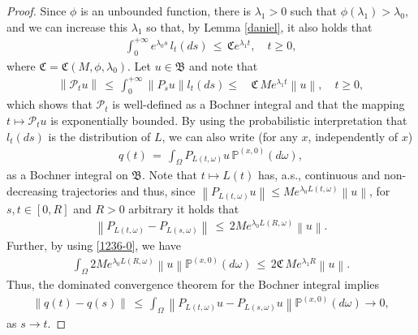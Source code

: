 \documentclass[reqno]{amsart}
\theoremstyle{remark}
\numberwithin{equation}{section} %
\newcommand{\1}{\mathds{1}}
\begin{document}
	\begin{proof}
		Since $\phi$ is an unbounded function, there is $\lambda_1>0$ such that $\phi(\lambda_1) > \lambda_0$, and we can increase this $\lambda_1$ so that, by Lemma \ref{daniel}, it also holds that
		\begin{align}\label{1236-0}
			\int_0^{+\infty} e^{\lambda_0 s} \, l_t(ds) \, \leq \, \mathfrak{C}e^{\lambda_1 t},\quad t\ge0,
		\end{align}
		where $\mathfrak{C}=\mathfrak{C}(M, \phi, \lambda_0)$.
		Let $u \in \mathfrak{B}$ and note that 
		\begin{align}
			\left\|  \mathcal{P}_t u \right\| \, \leq \, \int_0^{+\infty} \left\| P_s u \right\| l_t(ds)  \leq \, & {\mathfrak{C}\,Me^{\lambda_1 t}} \left\| u \right\|,\quad t\ge0,
			\label{1236}
		\end{align}
		which shows that $\mathcal{P}_t$ is well-defined as a Bochner integral and that the mapping $t \mapsto \mathcal{P}_tu$ is exponentially bounded. By using the probabilistic interpretation that $l_t(ds)$ is the distribution of $L$, we can also write (for any $x$, independently of $x$)
		\begin{align}
			q(t) \, = \,\int_\Omega P_{L(t, \omega)} u \, \mathds{P}^{(x,0)}(d\omega),
			\label{exp_bochner}
		\end{align}
		as a Bochner integral on $\mathfrak{B}$. Note that $t \mapsto L(t)$ has, a.s., continuous and non-decreasing trajectories and thus, since  $\left\| P_{L(t,\omega)}u \right\| \leq M e^{\lambda_0L(t, \omega)} \left\| u \right\|$, for $s,t \in [0, R]$ and $R>0$ arbitrary it holds that
		\begin{align}
			\left\| P_{L(t, \omega)} - P_{L(s, \omega)} \right\| \,  \leq \, 2M e^{\lambda_0 L(R, \omega)} \left\| u \right\|.
		\end{align}
		Further, by using \eqref{1236-0}, we have
		\begin{align}
			\int_\Omega 2M e^{\lambda_0 L(R, \omega)} \left\| u \right\| \mathds{P}^{(x,0)} (d\omega) \, \leq \, 2\mathfrak{C} \,Me^{\lambda_1 R} \left\| u \right\|.
		\end{align}
		Thus, the dominated convergence theorem for the Bochner integral \cite[Theorem E.6]{cohn2013measure} implies
		\begin{align}
			\left\| q(t) - q(s) \right\| \, \leq \, \int_\Omega \left\| P_{L(t, \omega)}u - P_{L(s, \omega)}u \right\| \mathds{P}^{(x,0)}(d\omega) \to 0,
			\label{1249}
		\end{align}
		as $s \to t$.
		

\end{proof}
\end{document}
